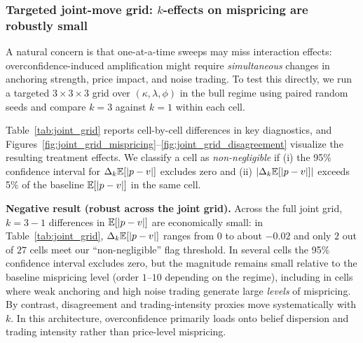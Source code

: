 \subsubsection{Targeted joint-move grid: \texorpdfstring{$k$}{k}-effects on mispricing are robustly small}
\label{subsec:joint_grid}
A natural concern is that one-at-a-time sweeps may miss interaction effects: overconfidence-induced amplification might require
\emph{simultaneous} changes in anchoring strength, price impact, and noise trading. To test this directly, we run a targeted
$3\times 3\times 3$ grid over $(\kappa,\lambda,\phi)$ in the bull regime using paired random seeds and compare
$k=3$ against $k=1$ within each cell.

Table~\ref{tab:joint_grid} reports cell-by-cell differences in key diagnostics, and
Figures~\ref{fig:joint_grid_mispricing}--\ref{fig:joint_grid_disagreement} visualize the resulting treatment effects.
We classify a cell as \emph{non-negligible} if (i) the 95\% confidence interval for $\Delta_k \mathbb{E}[|p-v|]$ excludes zero and
(ii) $|\Delta_k \mathbb{E}[|p-v|]|$ exceeds 5\% of the baseline $\mathbb{E}[|p-v|]$ in the same cell.

\textbf{Negative result (robust across the joint grid).}
Across the full joint grid, $k=3-1$ differences in $\mathbb{E}[|p-v|]$ are economically small: in Table~\ref{tab:joint_grid}, $\Delta_k\mathbb{E}[|p-v|]$ ranges from $0$ to about $-0.02$ and only $2$ out of $27$ cells meet our ``non-negligible'' flag threshold.
In several cells the 95\% confidence interval excludes zero, but the magnitude remains small relative to the baseline mispricing level (order $1$--$10$ depending on the regime),
including in cells where weak anchoring and high noise trading generate large \emph{levels} of mispricing.
By contrast, disagreement and trading-intensity proxies move systematically with $k$.
In this architecture, overconfidence primarily loads onto belief dispersion and trading intensity rather than price-level mispricing.

\begin{table}[t]
  \centering
  \scriptsize
  \setlength{\tabcolsep}{3pt}
  \resizebox{\columnwidth}{!}{}
  \caption{Joint-grid treatment effects $\Delta_k$ across $(\kappa,\lambda,\phi)$ (Bull regime; $\Delta$ denotes $k=3$ minus $k=1$; mean $\pm$ 95\% CI across paired seeds; ``Flag'' per thresholds in text).}
  \label{tab:joint_grid}
\end{table}

